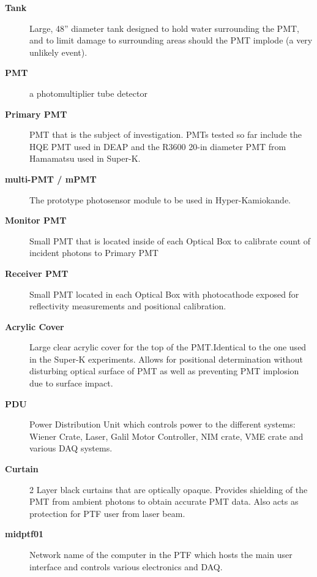 \documentclass[twoside,letterpaper]{refart}
\begin{document}
\begin{description}
	\item[\textbf{Tank}] Large, 48'' diameter tank designed to hold water surrounding the PMT, and to limit damage to surrounding areas should the PMT implode (a very unlikely event).
	\item[\textbf{PMT}] a photomultiplier tube detector
	\item[\textbf{Primary PMT}] PMT that is the subject of investigation. PMTs tested so far include the HQE PMT used in DEAP and the R3600 20-in diameter PMT from Hamamatsu used in Super-K.
	\item[\textbf{multi-PMT / mPMT}] The prototype photosensor module to be used in Hyper-Kamiokande.
	\item[\textbf{Monitor PMT}] Small PMT that is located inside of each Optical Box to calibrate count of incident photons to Primary PMT
	\item[\textbf{Receiver PMT}] Small PMT located in each Optical Box with photocathode exposed for reflectivity measurements and positional calibration.
	\item[\textbf{Acrylic Cover}] Large clear acrylic cover for the top of the PMT.\@ Identical to the one used in the Super-K experiments. Allows for positional determination without disturbing optical surface of PMT as well as preventing PMT implosion due to surface impact.
	\item[\textbf{PDU}] Power Distribution Unit which controls power to the different systems: Wiener Crate, Laser, Galil Motor Controller, NIM crate, VME crate and various DAQ systems.
	\item[\textbf{Curtain}] 2 Layer black curtains that are optically opaque. Provides shielding of the PMT from ambient photons to obtain accurate PMT data. Also acts as protection for PTF user from laser beam.
	\item[\textbf{midptf01}] Network name of the computer in the PTF which hosts the main user interface and controls various electronics and DAQ.
	
	
\end{description}
\end{document}
